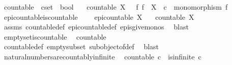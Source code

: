 \begin{isabellebody}
\begin{isamarkuptext}
\end{isamarkuptext}\isamarkuptrue%
\isamarkupfalse%
\ countable\ {\isacharcolon}{\kern0pt}{\isacharcolon}{\kern0pt}\ {\isachardoublequoteopen}cset\ {\isasymRightarrow}\ bool{\isachardoublequoteclose}\ \isanewline
\ \ {\isachardoublequoteopen}countable\ X\ {\isasymlongleftrightarrow}\ {\isacharparenleft}{\kern0pt}{\isasymexists}\ f{\isachardot}{\kern0pt}\ f\ {\isacharcolon}{\kern0pt}\ X\ {\isasymrightarrow}\ {\isasymnat}\isactrlsub c\ {\isasymand}\ monomorphism\ f{\isacharparenright}{\kern0pt}{\isachardoublequoteclose}\isanewline
\isanewline
{}\isamarkupfalse%
\ epi{\isacharunderscore}{\kern0pt}countable{\isacharunderscore}{\kern0pt}is{\isacharunderscore}{\kern0pt}countable{\isacharcolon}{\kern0pt}\ \isanewline
\ \ \ {\isachardoublequoteopen}epi{\isacharunderscore}{\kern0pt}countable\ X{\isachardoublequoteclose}\isanewline
\ \ \ {\isachardoublequoteopen}countable\ X{\isachardoublequoteclose}\isanewline
%
\isadelimproof
\ \ %
\endisadelimproof
%
\isatagproof
{}\isamarkupfalse%
\ assms\ countable{\isacharunderscore}{\kern0pt}def\ epi{\isacharunderscore}{\kern0pt}countable{\isacharunderscore}{\kern0pt}def\ epis{\isacharunderscore}{\kern0pt}give{\isacharunderscore}{\kern0pt}monos\ \isamarkupfalse%
\ blast%
\endisatagproof
{\isafoldproof}%
%
\isadelimproof
\isanewline
%
\endisadelimproof
\isanewline
{}\isamarkupfalse%
\ emptyset{\isacharunderscore}{\kern0pt}is{\isacharunderscore}{\kern0pt}countable{\isacharcolon}{\kern0pt}\isanewline
\ \ {\isachardoublequoteopen}countable\ {\isasymemptyset}{\isachardoublequoteclose}\isanewline
%
\isadelimproof
\ \ %
\endisadelimproof
%
\isatagproof
{}\isamarkupfalse%
\ countable{\isacharunderscore}{\kern0pt}def\ empty{\isacharunderscore}{\kern0pt}subset\ subobject{\isacharunderscore}{\kern0pt}of{\isacharunderscore}{\kern0pt}def{}\ \isamarkupfalse%
\ blast%
\endisatagproof
{\isafoldproof}%
%
\isadelimproof
\isanewline
%
\endisadelimproof
\isanewline
{}\isamarkupfalse%
\ natural{\isacharunderscore}{\kern0pt}numbers{\isacharunderscore}{\kern0pt}are{\isacharunderscore}{\kern0pt}countably{\isacharunderscore}{\kern0pt}infinite{\isacharcolon}{\kern0pt}\isanewline
\ \ {\isachardoublequoteopen}{\isacharparenleft}{\kern0pt}countable\ {\isasymnat}\isactrlsub c{\isacharparenright}{\kern0pt}\ {\isasymand}\ {\isacharparenleft}{\kern0pt}is{\isacharunderscore}{\kern0pt}infinite\ {\isasymnat}\isactrlsub c{\isacharparenright}{\kern0pt}{\isachardoublequoteclose}\isanewline

\end{isabellebody}

